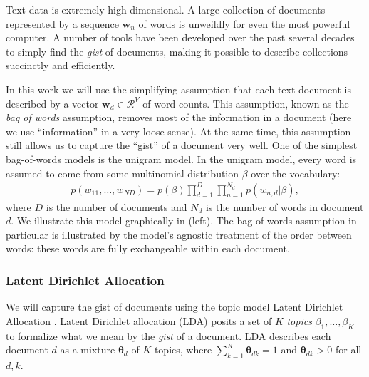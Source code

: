   
  Text data is extremely high-dimensional.  A large collection of
  documents represented by a sequence $\bm w_n$ of words is unweildly
  for even the most powerful computer.  A number of tools have been
  developed over the past several decades to simply find the
  \emph{gist} of documents, making it possible to describe collections
  succinctly and efficiently.

  In this work we will use the simplifying assumption that each text
  document is described by a vector $\bm w_d \in \mathcal{R}^V$ of
  word counts.  This assumption, known as the \emph{bag of words}
  assumption, removes most of the information in a document (here we
  use ``information'' in a very loose sense).  At the same time, this
  assumption still allows us to capture the ``gist'' of a document
  very well. One of the simplest bag-of-words models is the unigram
  model. In the unigram model, every word is assumed to come from
  some multinomial distribution $\beta$ over the vocabulary:
  \begin{align*}
    p(w_{11}, \ldots, w_{ND}) = p(\beta) \prod_{d=1}^D \prod_{n=1}^{N_d} p(w_{n,d} |
  \beta),
\end{align*}
  where $D$ is the number of documents and $N_d$ is the number of
  words in document $d$.
  We illustrate this model graphically in
   (left).  The bag-of-words assumption in
  particular is illustrated by the model's agnostic treatment of the
  order between words: these words are fully exchangeable within each
  document.

\subsubsection{Latent Dirichlet Allocation}
We will capture the gist of documents using the topic model Latent
Dirichlet Allocation \citep{blei:2003}.  Latent Dirichlet allocation
(LDA) posits a set of $K$ \emph{topics} $\beta_1, \ldots, \beta_K$ to
formalize what we mean by the \emph{gist} of a document.  LDA
describes each document $d$ as a mixture $\bm \theta_d$ of $K$ topics,
where $\sum_{k=1}^K \bm \theta_{dk} = 1$ and $\bm \theta_{dk} > 0$ 
for all $d,k$.

